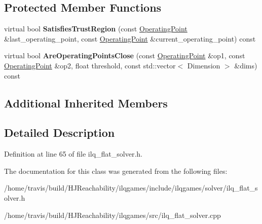 \subsection*{Protected Member Functions}
\begin{DoxyCompactItemize}
\item 
virtual bool {\bfseries Satisfies\+Trust\+Region} (const \hyperlink{structilqgames_1_1_operating_point}{Operating\+Point} \&last\+\_\+operating\+\_\+point, const \hyperlink{structilqgames_1_1_operating_point}{Operating\+Point} \&current\+\_\+operating\+\_\+point) const \hypertarget{classilqgames_1_1_i_l_q_flat_solver_a0f9a32d7bb55ff8d44c6a34ecc2335ee}{}\label{classilqgames_1_1_i_l_q_flat_solver_a0f9a32d7bb55ff8d44c6a34ecc2335ee}

\item 
virtual bool {\bfseries Are\+Operating\+Points\+Close} (const \hyperlink{structilqgames_1_1_operating_point}{Operating\+Point} \&op1, const \hyperlink{structilqgames_1_1_operating_point}{Operating\+Point} \&op2, float threshold, const std\+::vector$<$ Dimension $>$ \&dims) const \hypertarget{classilqgames_1_1_i_l_q_flat_solver_a4b79c70958d7ac9eb19c8b95de8dc33a}{}\label{classilqgames_1_1_i_l_q_flat_solver_a4b79c70958d7ac9eb19c8b95de8dc33a}

\end{DoxyCompactItemize}
\subsection*{Additional Inherited Members}


\subsection{Detailed Description}


Definition at line 65 of file ilq\+\_\+flat\+\_\+solver.\+h.



The documentation for this class was generated from the following files\+:\begin{DoxyCompactItemize}
\item 
/home/travis/build/\+H\+J\+Reachability/ilqgames/include/ilqgames/solver/ilq\+\_\+flat\+\_\+solver.\+h\item 
/home/travis/build/\+H\+J\+Reachability/ilqgames/src/ilq\+\_\+flat\+\_\+solver.\+cpp\end{DoxyCompactItemize}
